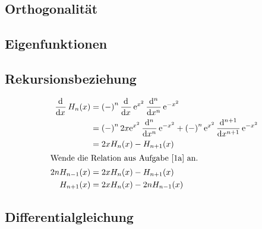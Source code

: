 \subsection{Orthogonalität}
\subsection{Eigenfunktionen}
\subsection{Rekursionsbeziehung}

\begin{align*}
	\dod{}x H_n(x)
	&= \del-^n \dod{}x \ee^{x^2} \dod[n]{}x \ee^{-x^2} \\
	&= \del-^n 2x \ee^{x^2} \dod[n]{}x \ee^{-x^2} + \del-^n \ee^{x^2} \dod[n+1]{}x \ee^{-x^2} \\
	&= 2x H_n(x) - H_{n+1}(x) \\
	\intertext{%
		Wende die Relation aus Aufgabe \ref{1a} an.
	}
	2n H_{n-1}(x)
	&= 2x H_n(x) - H_{n+1}(x) \\
	H_{n+1}(x)
	&= 2x H_n(x) - 2n H_{n-1}(x) \\
\end{align*}

\subsection{Differentialgleichung}


\IfFileExists{\bibliographyfile}{
	
}{}




